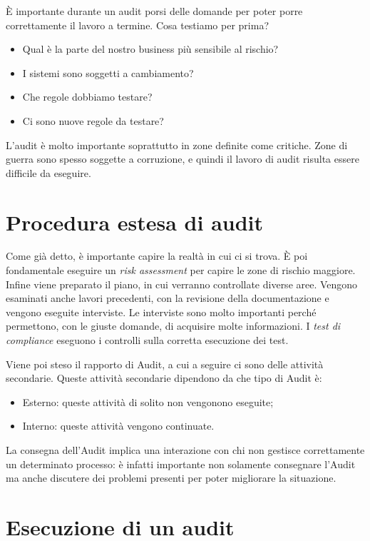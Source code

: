 È importante durante un audit porsi delle domande per poter porre correttamente
il lavoro a termine.
Cosa testiamo per prima?
\begin{itemize}
\item Qual è la parte del nostro business più sensibile al rischio?
\item I sistemi sono soggetti a cambiamento?
\item Che regole dobbiamo testare?
\item Ci sono nuove regole da testare?
\end{itemize}

L'audit è molto importante soprattutto in zone definite come critiche. Zone di
guerra sono spesso soggette a corruzione, e quindi il lavoro di audit risulta
essere difficile da eseguire.

\section{Procedura estesa di audit}

Come già detto, è importante capire la realtà in cui ci si trova. È poi
fondamentale eseguire un \textit{risk assessment} per capire le zone di rischio
maggiore.
Infine viene preparato il piano, in cui verranno controllate diverse aree.
Vengono esaminati anche lavori precedenti, con la revisione della
documentazione
e vengono eseguite interviste. Le interviste sono molto importanti perché
permettono, con le giuste domande, di acquisire molte informazioni.
I \textit{test di compliance} eseguono i controlli sulla corretta esecuzione
dei
test.

Viene poi steso il rapporto di Audit, a cui a seguire ci sono delle attività
secondarie. Queste attività secondarie dipendono da che tipo di Audit è:
\begin{itemize}
\item Esterno: queste attività di solito non vengonono eseguite;
\item Interno: queste attività vengono continuate.
\end{itemize}

La consegna dell'Audit implica una interazione con chi non gestisce
correttamente un determinato processo: è infatti importante non solamente
consegnare l'Audit ma anche discutere dei problemi presenti per poter
migliorare
la situazione.

\section{Esecuzione di un audit}

